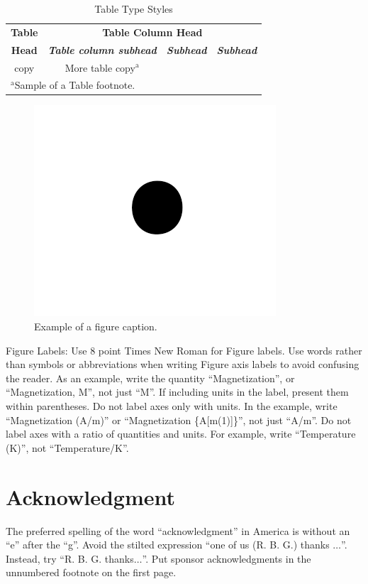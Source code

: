 \documentclass[conference]{IEEEtran}
\begin{document}
\begin{table}[htbp]
\caption{Table Type Styles}
\begin{center}
\begin{tabular}{|c|c|c|c|}
\hline
\textbf{Table}&\multicolumn{3}{|c|}{\textbf{Table Column Head}} \\
\cline{2-4} 
\textbf{Head} & \textbf{\textit{Table column subhead}}& \textbf{\textit{Subhead}}& \textbf{\textit{Subhead}} \\
\hline
copy& More table copy$^{\mathrm{a}}$& &  \\
\hline
\multicolumn{4}{l}{$^{\mathrm{a}}$Sample of a Table footnote.}
\end{tabular}
\label{tab1}
\end{center}
\end{table}

\begin{figure}[htbp]
\centerline{\includegraphics{pictures/fig1.png}}
\caption{Example of a figure caption.}
\label{fig}
\end{figure}

Figure Labels: Use 8 point Times New Roman for Figure labels. Use words 
rather than symbols or abbreviations when writing Figure axis labels to 
avoid confusing the reader. As an example, write the quantity 
``Magnetization'', or ``Magnetization, M'', not just ``M''. If including 
units in the label, present them within parentheses. Do not label axes only 
with units. In the example, write ``Magnetization (A/m)'' or ``Magnetization 
\{A[m(1)]\}'', not just ``A/m''. Do not label axes with a ratio of 
quantities and units. For example, write ``Temperature (K)'', not 
``Temperature/K''.

\section*{Acknowledgment}

The preferred spelling of the word ``acknowledgment'' in America is without 
an ``e'' after the ``g''. Avoid the stilted expression ``one of us (R. B. 
G.) thanks $\ldots$''. Instead, try ``R. B. G. thanks$\ldots$''. Put sponsor 
acknowledgments in the unnumbered footnote on the first page.

\vspace{12pt}

 
\end{document}

